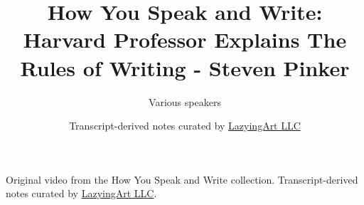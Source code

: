 \documentclass[11pt,oneside]{book}
\begin{document}
\frontmatter
\title{How You Speak and Write: Harvard Professor Explains The Rules of Writing - Steven Pinker}
\author{Various speakers}
\date{Transcript-derived notes curated by \href{https://lazying.art}{LazyingArt LLC}}
\maketitle
\begin{center}
\small Original video from the How You Speak and Write collection. Transcript-derived notes curated by \href{https://lazying.art}{LazyingArt LLC}.
\end{center}
\clearpage
\mainmatter

\end{document}
